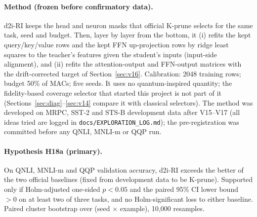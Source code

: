 \documentclass[11pt]{article}
\begin{document}
\paragraph{Method (frozen before confirmatory data).} d2i-RI keeps the head and neuron masks that official K-prune selects for the same task, seed and budget. Then, layer by layer from the bottom, it
(i) refits the kept query/key/value rows and the kept FFN up-projection rows by ridge least squares to the teacher's features given the student's inputs (input-side alignment), and
(ii) refits the attention-output and FFN-output matrices with the drift-corrected target of Section~\ref{sec:v16}. Calibration: 2048 training rows; budget 50\% of MACs; five seeds. It uses no quantum-inspired quantity;
the fidelity-based coverage selector that started this project is not part of it (Sections~\ref{sec:diag}--\ref{sec:v14} compare it with classical selectors). The method was developed on MRPC, SST-2 and STS-B development data after V15--V17
(all ideas tried are logged in \texttt{docs/EXPLORATION\_LOG.md}); the pre-registration was committed before any QNLI, MNLI-m or QQP run.
\paragraph{Hypothesis H18a (primary).} On QNLI, MNLI-m and QQP validation accuracy, d2i-RI exceeds the better of the two official baselines (fixed from development data to be K-prune). Supported only if Holm-adjusted one-sided
$p<0.05$ and the paired 95\% CI lower bound $>0$ on at least two of three tasks, and no Holm-significant loss to either baseline. Paired cluster bootstrap over (seed $\times$ example), 10{,}000 resamples.
\end{document}
